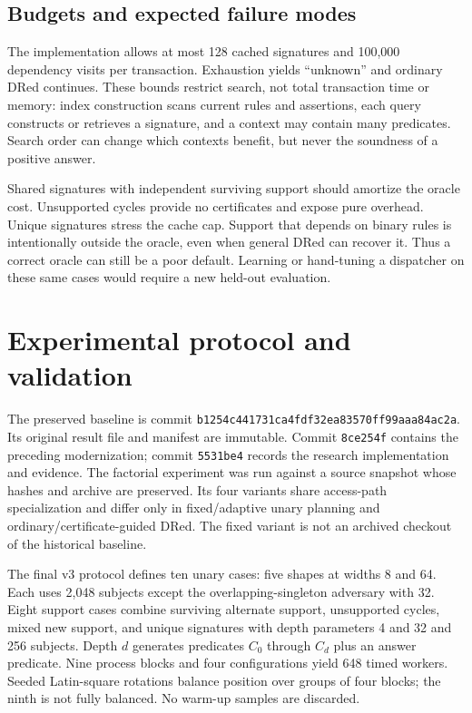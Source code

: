 \documentclass{article}
\newcommand{\code}[1]{\texttt{#1}}
\begin{document}
\subsection{Budgets and expected failure modes}
The implementation allows at most 128 cached signatures and 100,000 dependency
visits per transaction. Exhaustion yields ``unknown'' and ordinary DRed
continues. These bounds restrict search, not total transaction time or memory:
index construction scans current rules and assertions, each query constructs or
retrieves a signature, and a context may contain many predicates. Search order
can change which contexts benefit, but never the soundness of a positive answer.

Shared signatures with independent surviving support should amortize the oracle
cost. Unsupported cycles provide no certificates and expose pure overhead.
Unique signatures stress the cache cap. Support that depends on binary rules
is intentionally outside the oracle, even when general DRed can recover it.
Thus a correct oracle can still be a poor default. Learning or hand-tuning a
dispatcher on these same cases would require a new held-out evaluation.

\section{Experimental protocol and validation}
The preserved baseline is commit
\code{b1254c441731ca4fdf32ea83570ff99aaa84ac2a}. Its original result file and
manifest are immutable. Commit \code{8ce254f} contains the preceding
modernization; commit \code{5531be4} records the research implementation and
evidence. The factorial experiment was run against a source snapshot whose
hashes and archive are preserved. Its four variants share access-path
specialization and differ only in fixed/adaptive unary planning and
ordinary/certificate-guided DRed. The fixed variant is not an archived checkout
of the historical baseline.

The final v3 protocol defines ten unary cases: five shapes at widths 8 and 64.
Each uses 2,048 subjects except the overlapping-singleton adversary with 32.
Eight support cases combine surviving alternate support, unsupported cycles,
mixed new support, and unique signatures with depth parameters 4 and 32 and
256 subjects. Depth $d$ generates predicates $C_0$ through $C_d$ plus an answer
predicate. Nine process blocks and four configurations yield 648 timed workers.
Seeded Latin-square rotations balance position over groups of four blocks;
the ninth is not fully balanced. No warm-up samples are discarded.
\end{document}
